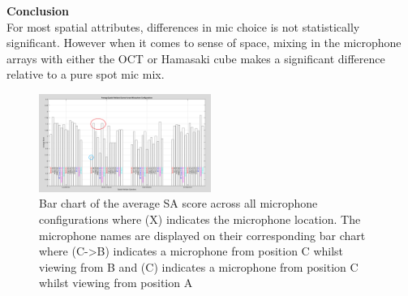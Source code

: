 		\textbf{Conclusion} \\

		For most spatial attributes, differences in mic choice is not statistically significant. However when it comes to sense of space, mixing in the microphone arrays with either the OCT or Hamasaki cube makes a significant difference relative to a pure spot mic mix. 

		\begin{figure}
			\includegraphics[width=0.5\textwidth]{images/plots/allMics_edit.PNG}
			\caption{Bar chart of the average SA score across all microphone configurations where (X) indicates the microphone location. The microphone names are displayed on their corresponding bar chart where (C->B) indicates a microphone from position C whilst viewing from B and (C) indicates a microphone from position C whilst viewing from position A}
			\label{image:sa_allmics} 
		\end{figure}

